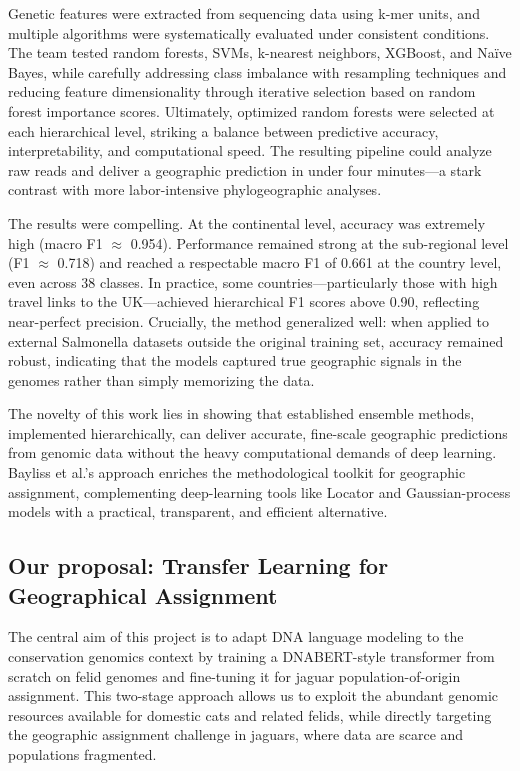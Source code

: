 Genetic features were extracted from sequencing data using k-mer units, and multiple algorithms were systematically evaluated under consistent conditions. The team tested random forests, SVMs, k-nearest neighbors, XGBoost, and Naïve Bayes, while carefully addressing class imbalance with resampling techniques and reducing feature dimensionality through iterative selection based on random forest importance scores. Ultimately, optimized random forests were selected at each hierarchical level, striking a balance between predictive accuracy, interpretability, and computational speed. The resulting pipeline could analyze raw reads and deliver a geographic prediction in under four minutes—a stark contrast with more labor-intensive phylogeographic analyses.

The results were compelling. At the continental level, accuracy was extremely high (macro F1 $\approx$ 0.954). Performance remained strong at the sub-regional level (F1 $\approx$ 0.718) and reached a respectable macro F1 of 0.661 at the country level, even across 38 classes. In practice, some countries—particularly those with high travel links to the UK—achieved hierarchical F1 scores above 0.90, reflecting near-perfect precision. Crucially, the method generalized well: when applied to external Salmonella datasets outside the original training set, accuracy remained robust, indicating that the models captured true geographic signals in the genomes rather than simply memorizing the data.

The novelty of this work lies in showing that established ensemble methods, implemented hierarchically, can deliver accurate, fine-scale geographic predictions from genomic data without the heavy computational demands of deep learning. Bayliss et al.'s approach enriches the methodological toolkit for geographic assignment, complementing deep-learning tools like Locator and Gaussian-process models with a practical, transparent, and efficient alternative.

\subsection{Our proposal: Transfer Learning for Geographical Assignment}

The central aim of this project is to adapt DNA language modeling to the conservation genomics context by training a DNABERT-style transformer from scratch on felid genomes and fine-tuning it for jaguar population-of-origin assignment. This two-stage approach allows us to exploit the abundant genomic resources available for domestic cats and related felids, while directly targeting the geographic assignment challenge in jaguars, where data are scarce and populations fragmented.

